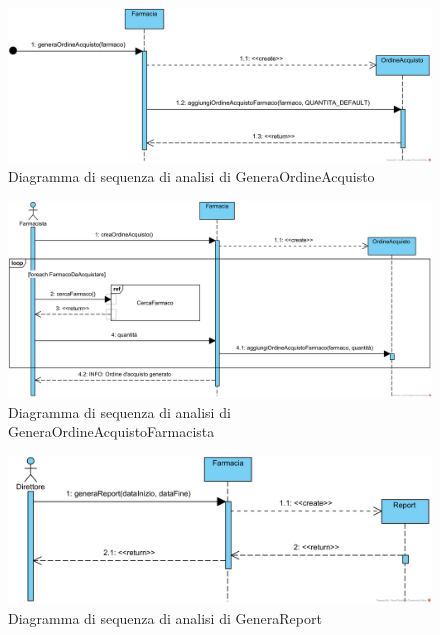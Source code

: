 \begin{figure}[!hbp]
	\centering
	\includegraphics[width=0.8\linewidth]{assets/sequence_analisi/SequenceAnalisiGeneraOrdineAcquisto.png}
	\caption{Diagramma di sequenza di analisi di GeneraOrdineAcquisto}
\end{figure}

\begin{figure}[!hbp]
	\centering
	\includegraphics[width=\linewidth]{assets/sequence_analisi/SequenceAnalisiGeneraOrdineAcquistoFarmacista.png}
	\caption{Diagramma di sequenza di analisi di GeneraOrdineAcquistoFarmacista}
\end{figure}

\begin{figure}[!hbp]
	\centering
	\includegraphics[width=0.8\linewidth]{assets/sequence_analisi/SequenceAnalisiGeneraReport.png}
	\caption{Diagramma di sequenza di analisi di GeneraReport}
\end{figure}

\pagebreak


